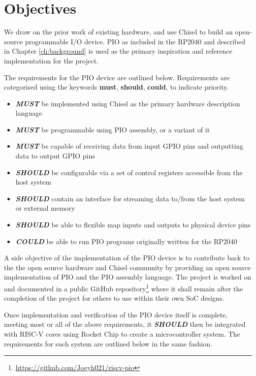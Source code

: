 \chapter{Objectives}
\label{ch:objectives}

We draw on the prior work of existing hardware, and use Chisel to build an open-source programmable I/O device. PIO as included in the RP2040 and described in Chapter \ref{ch:background} is used as the primary inspiration and reference implementation for the project.

The requirements for the PIO device are outlined below. Requirements are categorised using the keywords \textbf{must}, \textbf{should}, \textbf{could}, to indicate priority.

\begin{itemize}
    \item \textit{\textbf{MUST}} be implemented using Chisel as the primary hardware description language
    \item \textit{\textbf{MUST}} be programmable using PIO assembly, or a variant of it
    \item \textit{\textbf{MUST}} be capable of receiving data from input GPIO pins and outputting data to output GPIO pins
    \item \textit{\textbf{SHOULD}} be configurable via a set of control registers accessible from the host system
    \item \textit{\textbf{SHOULD}} contain an interface for streaming data to/from the host system or external memory
    \item \textit{\textbf{SHOULD}} be able to flexible map inputs and outputs to physical device pins
    \item \textit{\textbf{COULD}} be able to run PIO programs originally written for the RP2040
\end{itemize}

A side objective of the implementation of the PIO device is to contribute back to the the open source hardware and Chisel community by providing an open source implementation of PIO and the PIO assembly language. The project is worked on and documented in a public GitHub repository\footnote{\url{https://github.com/Joeyh021/riscv-pio}} where it shall remain after the completion of the project for others to use within their own SoC designs.

Once implementation and verification of the PIO device itself is complete, meeting most or all of the above requirements, it \textit{\textbf{SHOULD}} then be integrated with RISC-V cores using Rocket Chip to create a microcontroller system. The requirements for such system are outlined below in the same fashion.

